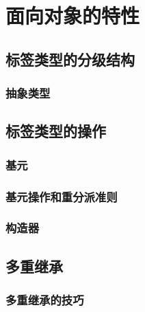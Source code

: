 %
%
%

\chapter{面向对象的特性}

\section{标签类型的分级结构}
\subsection{抽象类型}
\label{c:oof:tagged:abstract}

\section{标签类型的操作}

\subsection{基元}
\label{c:oof:tagged:primitive} %

\subsection{基元操作和重分派准则}
\label{c:oof:tagged:dispatch}

\subsection{构造器}
\label{c:oof:tagged:constructor} 

\section{多重继承}
\subsection{多重继承的技巧}
\label{c:oof:mul-inh:tech}

